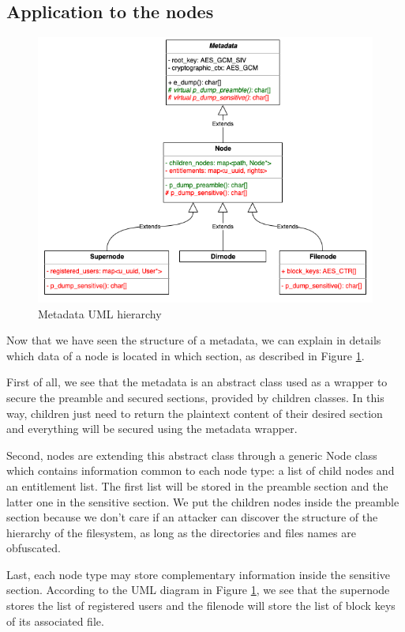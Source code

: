 \documentclass[../main.tex]{subfiles}
\begin{document}
\subsection{Application to the nodes}
\label{section:lauxus:nodes_hierarchy}

\begin{figure}[h]
    \centering
    \includegraphics[width=.75\textwidth]{images/lauxus/metadata_hierarchy}
    
    \caption{Metadata UML hierarchy}
    \label{figure:lauxus:metadata_hierarchy}
\end{figure}
\par Now that we have seen the structure of a metadata, we can explain in details which data of a node is located in which section, as described in  Figure \ref{figure:lauxus:metadata_hierarchy}.
\par First of all, we see that the metadata is an abstract class used as a wrapper to secure the preamble and secured sections, provided by children classes. In this way, children just need to return the plaintext content of their desired section and everything will be secured using the metadata wrapper.
\par Second, nodes are extending this abstract class through a generic Node class which contains information common to each node type: a list of child nodes and an entitlement list. The first list will be stored in the preamble section and the latter one in the sensitive section. We put the children nodes inside the preamble section because we don't care if an attacker can discover the structure of the hierarchy of the filesystem, as long as the directories and files names are obfuscated.
\par Last, each node type may store complementary information inside the sensitive section. According to the UML diagram in Figure \ref{figure:lauxus:metadata_hierarchy}, we see that the supernode stores the list of registered users and the filenode will store the list of block keys of its associated file.
\end{document}
